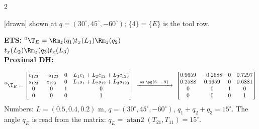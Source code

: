 \begin{multicols}{2}
\begin{worked}
\begin{minipage}[c]{0.42\linewidth}\centering
{}\par{\sffamily\scriptsize\color{slate}[drawn] shown at $q=(30^\circ,45^\circ,-60^\circ)$; $\{4\}=\{E\}$ is the tool row.}
\end{minipage}\hfill
\begin{minipage}[c]{0.55\linewidth}
\textbf{ETS:} ${}^0\T_E=\Rm_z(q_1)t_x(L_1)\Rm_z(q_2)$\\ $t_x(L_2)\Rm_z(q_3)t_x(L_3)$\\[3pt]
\textbf{Proximal DH:}\\
\end{minipage}
\[{}^0\T_E=\begin{bmatrix}c_{123}&-s_{123}&0&L_1c_1+L_2c_{12}+L_3c_{123}\\s_{123}&c_{123}&0&L_1s_1+L_2s_{12}+L_3s_{123}\\0&0&1&0\\0&0&0&1\end{bmatrix}\ \xrightarrow{\ \text{as }\pg{6--9}\ }\ \begin{bmatrix}0.9659&-0.2588&0&0.7297\\0.2588&0.9659&0&0.6881\\0&0&1&0\\0&0&0&1\end{bmatrix}\]
Numbers: $L=(0.5,0.4,0.2)$ m, $q=(30^\circ,45^\circ,-60^\circ)$, $q_1{+}q_2{+}q_3=15^\circ$. The angle $q_E$ is read from the matrix: $q_E=\operatorname{atan2}(T_{21},T_{11})=15^\circ$. \chk
\end{worked}


\end{multicols}
